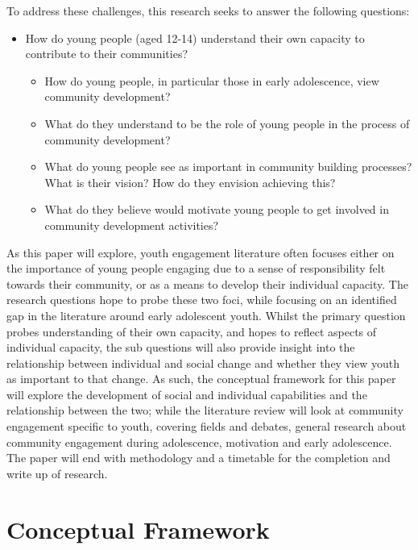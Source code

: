 To address these challenges, this research seeks to answer the following questions:
\begin{itemize}
\item How do young people (aged 12-14) understand their own capacity to contribute to their communities?
\begin{itemize}
	\item How do young people, in particular those in early adolescence, view community development? 
	\item What do they understand to be the role of young people in the process of community development?
	\item What do young people see as important in community building processes? What is their vision? How do they envision achieving this?
	\item What do they believe would motivate young people to get involved in community development activities?
\end{itemize}
\end{itemize}

As this paper will explore, youth engagement literature often focuses either on the importance of young people engaging due to a sense of responsibility felt towards their community, or as a means to develop their individual capacity. The research questions hope to probe these two foci, while focusing on an identified gap in the literature around early adolescent youth. Whilst the primary question probes understanding of their own capacity, and hopes to reflect aspects of individual capacity, %
the sub questions will also provide insight into the relationship between individual and social change and whether they view youth as important to that change. As such, the conceptual framework for this paper will explore the development of social and individual capabilities and the relationship between the two; while the literature review will look at community engagement specific to youth, covering fields and debates, general research about community engagement during adolescence, motivation and early adolescence. The paper will end with methodology and a timetable for the completion and write up of research.

\section{Conceptual Framework} 

